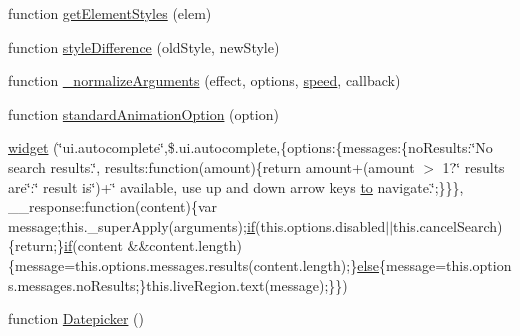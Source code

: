 \begin{DoxyCompactItemize}
\item 
function \hyperlink{jquery-ui_8js_a9379a5f197a05a80427513c960d08a1d}{get\+Element\+Styles} (elem)
\item 
function \hyperlink{jquery-ui_8js_a4f3d1ad57acfa53c094d81fbc686ece6}{style\+Difference} (old\+Style, new\+Style)
\item 
function \hyperlink{jquery-ui_8js_ab7fd4cad013d710739f7d645d2d040de}{\+\_\+normalize\+Arguments} (effect, options, \hyperlink{jquery-1_89_81_8js_add98c90065e6563cba26ff6d2016c46c}{speed}, callback)
\item 
function \hyperlink{jquery-ui_8js_afa426092b300f812643e065a141f4fba}{standard\+Animation\+Option} (option)
\item 
\hyperlink{jquery-ui_8js_a0dd351075c8ad17f9472cb9424deab0d}{widget} (\char`\"{}ui.\+autocomplete\char`\"{},\$.ui.\+autocomplete,\{options\+:\{messages\+:\{no\+Results\+:\char`\"{}No search results.\char`\"{}, results\+:function(amount)\{return amount+(amount $>$ 1?\char`\"{} results are\char`\"{}\+:\char`\"{} result is\char`\"{})+\char`\"{} available, use up and down arrow keys \hyperlink{jquery-ui_8js_af6086621f45baa2cf538f19e45d3c263}{to} navigate.\char`\"{};\}\}\}, \+\_\+\+\_\+response\+:function(content)\{var message;this.\+\_\+super\+Apply(arguments);\hyperlink{fullpage_2plugin_8js_a8b98017e64ef036adb9ae327ff94abe1}{if}(this.\+options.\+disabled$\vert$$\vert$this.\+cancel\+Search)\{return;\}\hyperlink{fullpage_2plugin_8js_a8b98017e64ef036adb9ae327ff94abe1}{if}(content \&\&content.\+length)\{message=this.\+options.\+messages.\+results(content.\+length);\}\hyperlink{jquery_8iframe-transport_8js_a0544c3fe466e421738dae463968b70ba}{else}\{message=this.\+options.\+messages.\+no\+Results;\}this.\+live\+Region.\+text(message);\}\})
\item 
function \hyperlink{jquery-ui_8js_acd86dc40a9307bcee01a9a1bffb4719c}{Datepicker} ()
\item 
$$
\end{DoxyCompactItemize}
